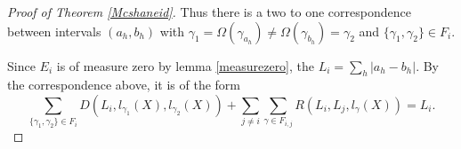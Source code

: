\begin{proof}[Proof of Theorem \ref{Mcshaneid}]
Thus there is a two to one correspondence between intervals $(a_h,b_h)$ with $\gamma_1=\Omega(\gamma_{a_h})\neq \Omega(\gamma_{b_h})=\gamma_2$ and $\{\gamma_1,\gamma_2\}\in F_i$.
 
Since $E_i$ is of measure zero by lemma \ref{measurezero}, the $L_i=\sum_{h}|a_h-b_h|$. By the correspondence above, it is of the form 
\begin{equation*}
\sum_{\{\gamma_1,\gamma_2\}\in F_i}D(L_i,l_{\gamma_1} (X),l_{\gamma_2}(X))+\sum_{j\neq i}\sum_{\gamma\in  F_{i,j}}R(L_i,L_j,l_{\gamma}(X))=L_i.
\end{equation*}
\end{proof}
